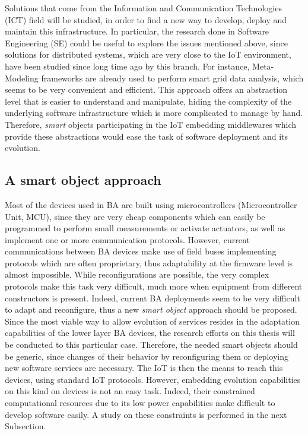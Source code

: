Solutions that come from the Information and Communication Technologies (ICT) field will be studied, in order to find a new way to develop, deploy and maintain this infrastructure.
In particular, the research done in Software Engineering (SE) could be useful to explore the issues mentioned above, since solutions for distributed systems, which are very close to the IoT environment, have been studied since long time ago by this branch.
For instance, Meta-Modeling frameworks are already used to perform smart grid data analysis\cite{hartmann2014realisticsmartgrid}, which seems to be very convenient and efficient.
This approach offers an abstraction level that is easier to understand and manipulate, hiding the complexity of the underlying software infrastructure which is more complicated to manage by hand.
Therefore, \textit{smart} objects participating in the IoT embedding middlewares which provide these abstractions would ease the task of software deployment and its evolution.

\subsection{A smart object approach}
\label{subsec:smartObjects}
Most of the devices used in BA are built using microcontrollers (Microcontroller Unit, MCU), since they are very cheap components which can easily be programmed to perform small measurements or activate actuators, as well as implement one or more communication protocols.
However, current communications between BA devices make use of field buses implementing protocols which are often proprietary, thus adaptability at the firmware level is almost impossible.
While reconfigurations are possible, the very complex protocols make this task very difficult, much more when equipment from different constructors is present.
Indeed, current BA deployments seem to be very difficult to adapt and reconfigure, thus a new \textit{smart object} approach should be proposed.
Since the most viable way to allow evolution of services resides in the adaptation capabilities of the lower layer BA devices, the research efforts on this thesis will be conducted to this particular case.
Therefore, the needed smart objects should be generic, since changes of their behavior by reconfiguring them or deploying new software services are necessary.
The IoT is then the means to reach this devices, using standard IoT protocols.
However, embedding evolution capabilities on this kind on devices is not an easy task.
Indeed, their constrained computational resources due to its low power capabilities make difficult to develop software easily.
A study on these constraints is performed in the next Subsection.



